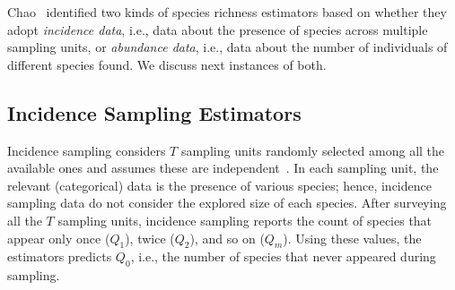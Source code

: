 \documentclass[sigconf,review,anonymous]{acmart}
\begin{document}
Chao~\cite{chao2016species} identified two kinds of species richness
estimators based on whether they adopt \emph{incidence data}, i.e., data about the
presence of species across multiple sampling units, or \emph{abundance data}, i.e., 
data about the number of individuals of different species found.
We discuss next instances of both.

%


\subsection{Incidence Sampling Estimators}
\label{sec:estimators-incidence}

%
Incidence sampling considers $T$ sampling units randomly selected among all
the available ones and assumes these are independent~\cite{chao2016species}.
%
In each sampling unit, the relevant (categorical) data is the presence of various species;
hence, incidence sampling data do not consider the explored size of each species.
%
After surveying all the $T$ sampling units, incidence sampling reports the count of species
that appear only once ($Q_1$), twice ($Q_2$), and so on ($Q_m$).
%
Using these values, the estimators predicts $Q_0$, i.e., the number of species that never
appeared during sampling.
\end{document}
